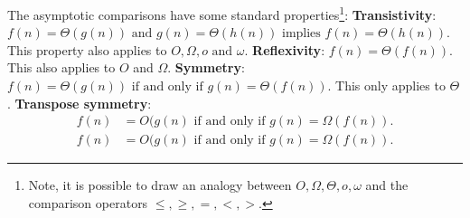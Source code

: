 \documentclass[12pt]{article}
\begin{document}
The asymptotic comparisons have some standard properties\footnote{Note, it is possible to draw an analogy between $O, \Omega, \Theta, o, \omega$ and the comparison operators
$\leq, \geq, =, <, >$.}:
\newline \textbf{Transistivity}: $f(n) = \Theta(g(n)) \text{ and } g(n) = \Theta(h(n)) \text{ implies } f(n) = \Theta(h(n))$.
This property also applies to $O, \Omega, o \text{ and }\omega$.
\newline \textbf{Reflexivity}: $f(n) = \Theta(f(n))$. This also applies to $O$ and $\Omega$.
\newline \textbf{Symmetry}: $f(n) = \Theta(g(n)) \text{ if and only if } g(n) = \Theta(f(n))$. This only applies to $\Theta$.
\newline \textbf{Transpose symmetry}:
\begin{align*}
    f(n)&= O(g(n) \text{ if and only if } g(n) = \Omega(f(n)).\\
    f(n)&= O(g(n) \text{ if and only if } g(n) = \Omega(f(n)).
\end{align*}
\end{document}
